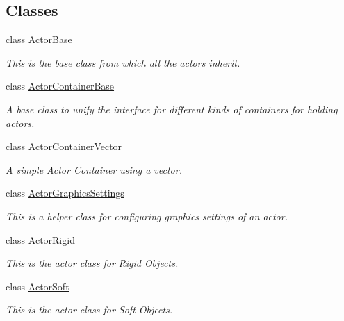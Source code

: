 \subsection*{Classes}
\begin{DoxyCompactItemize}
\item 
class \hyperlink{classphys_1_1ActorBase}{ActorBase}
\begin{DoxyCompactList}\small\item\em This is the base class from which all the actors inherit. \item\end{DoxyCompactList}\item 
class \hyperlink{classphys_1_1ActorContainerBase}{ActorContainerBase}
\begin{DoxyCompactList}\small\item\em A base class to unify the interface for different kinds of containers for holding actors. \item\end{DoxyCompactList}\item 
class \hyperlink{classphys_1_1ActorContainerVector}{ActorContainerVector}
\begin{DoxyCompactList}\small\item\em A simple Actor Container using a vector. \item\end{DoxyCompactList}\item 
class \hyperlink{classphys_1_1ActorGraphicsSettings}{ActorGraphicsSettings}
\begin{DoxyCompactList}\small\item\em This is a helper class for configuring graphics settings of an actor. \item\end{DoxyCompactList}\item 
class \hyperlink{classphys_1_1ActorRigid}{ActorRigid}
\begin{DoxyCompactList}\small\item\em This is the actor class for Rigid Objects. \item\end{DoxyCompactList}\item 
class \hyperlink{classphys_1_1ActorSoft}{ActorSoft}
\begin{DoxyCompactList}\small\item\em This is the actor class for Soft Objects. \item\end{DoxyCompactList}\item 

\end{DoxyCompactItemize}
